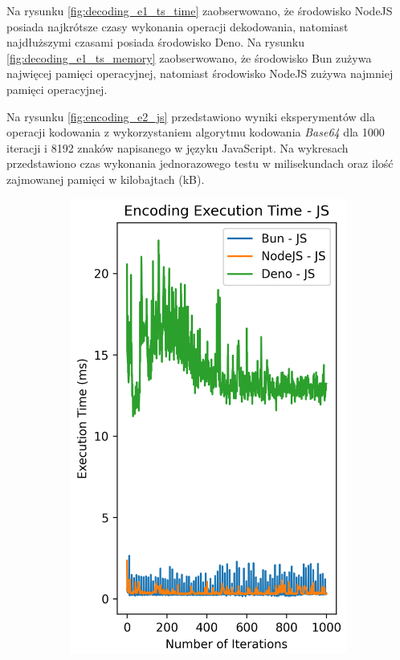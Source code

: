 Na rysunku \ref{fig:decoding_e1_ts_time} zaobserwowano, że środowisko NodeJS posiada najkrótsze czasy wykonania operacji dekodowania, natomiast najdłuższymi czasami posiada środowisko Deno. Na rysunku \ref{fig:decoding_e1_ts_memory} zaobserwowano, że środowisko Bun zużywa najwięcej pamięci operacyjnej, natomiast środowisko NodeJS zużywa najmniej pamięci operacyjnej.

Na rysunku \ref{fig:encoding_e2_js} przedstawiono wyniki eksperymentów dla operacji kodowania z wykorzystaniem algorytmu kodowania \textit{Base64} dla 1000 iteracji i 8192 znaków napisanego w języku JavaScript. Na wykresach przedstawiono czas wykonania jednorazowego testu w milisekundach oraz ilość zajmowanej pamięci w kilobajtach (kB).

\begin{figure}[H]
  \centering
  \begin{subfigure}[b]{0.44\textwidth}
    \centering
    \includegraphics[width=\textwidth]{Figures/coding/base64_1000_encoding_js_time.png}

\end{subfigure}
\end{figure}
